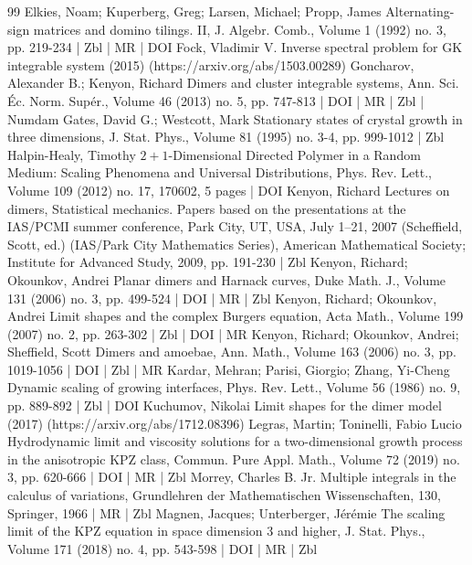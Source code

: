 \begin{thebibliography}{99}
Elkies, Noam; Kuperberg, Greg; Larsen, Michael; Propp, James Alternating-sign matrices and domino tilings. II, J. Algebr. Comb., Volume 1 (1992) no. 3, pp. 219-234 | Zbl | MR | DOI
Fock, Vladimir V. Inverse spectral problem for GK integrable system (2015) (https://arxiv.org/abs/1503.00289)
Goncharov, Alexander B.; Kenyon, Richard Dimers and cluster integrable systems, Ann. Sci. Éc. Norm. Supér., Volume 46 (2013) no. 5, pp. 747-813 | DOI | MR | Zbl | Numdam
Gates, David G.; Westcott, Mark Stationary states of crystal growth in three dimensions, J. Stat. Phys., Volume 81 (1995) no. 3-4, pp. 999-1012 | Zbl
Halpin-Healy, Timothy $2+1$-Dimensional Directed Polymer in a Random Medium: Scaling Phenomena and Universal Distributions, Phys. Rev. Lett., Volume 109 (2012) no. 17, 170602, 5 pages | DOI
Kenyon, Richard Lectures on dimers, Statistical mechanics. Papers based on the presentations at the IAS/PCMI summer conference, Park City, UT, USA, July 1–21, 2007 (Scheffield, Scott, ed.) (IAS/Park City Mathematics Series), American Mathematical Society; Institute for Advanced Study, 2009, pp. 191-230 | Zbl
Kenyon, Richard; Okounkov, Andrei Planar dimers and Harnack curves, Duke Math. J., Volume 131 (2006) no. 3, pp. 499-524 | DOI | MR | Zbl
Kenyon, Richard; Okounkov, Andrei Limit shapes and the complex Burgers equation, Acta Math., Volume 199 (2007) no. 2, pp. 263-302 | Zbl | DOI | MR
Kenyon, Richard; Okounkov, Andrei; Sheffield, Scott Dimers and amoebae, Ann. Math., Volume 163 (2006) no. 3, pp. 1019-1056 | DOI | Zbl | MR
Kardar, Mehran; Parisi, Giorgio; Zhang, Yi-Cheng Dynamic scaling of growing interfaces, Phys. Rev. Lett., Volume 56 (1986) no. 9, pp. 889-892 | Zbl | DOI
Kuchumov, Nikolai Limit shapes for the dimer model (2017) (https://arxiv.org/abs/1712.08396)
Legras, Martin; Toninelli, Fabio Lucio Hydrodynamic limit and viscosity solutions for a two-dimensional growth process in the anisotropic KPZ class, Commun. Pure Appl. Math., Volume 72 (2019) no. 3, pp. 620-666 | DOI | MR | Zbl
Morrey, Charles B. Jr. Multiple integrals in the calculus of variations, Grundlehren der Mathematischen Wissenschaften, 130, Springer, 1966 | MR | Zbl
Magnen, Jacques; Unterberger, Jérémie The scaling limit of the KPZ equation in space dimension 3 and higher, J. Stat. Phys., Volume 171 (2018) no. 4, pp. 543-598 | DOI | MR | Zbl

\end{thebibliography}
